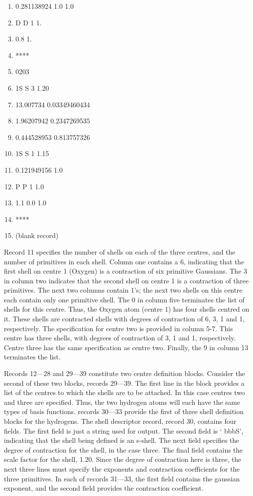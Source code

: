 {{\begin{enumerate}
\item 0.281138924          1.0                 1.0
\item          D   D 1 1.
\item 0.8                                                         1.
\item ****
\item 0203
\item         1S   S 3 1.20
\item 13.007734            0.03349460434
\item  1.96207942           0.2347269535
\item 0.444528953          0.813757326
\item         1S   S 1 1.15
\item 0.121949156          1.0
\item          P   P 1 1.0
\item 1.1                  0.0                 1.0
\item ****
\item (blank record)
\end{enumerate}
}
}
\newpage
Record 11 specifies the number of shells on each of the three centres, and
the number of primitives in each shell.  Column one contains a 6, indicating
that the first shell on centre 1 (Oxygen) is a contraction of six primitive
Gaussians.  The 3 in column two indicates that the second shell on centre 1
is a contraction of three primitives.  The next two columns contain 1's; the
next two shells on this centre each contain only one primitive shell.  
The 0
in column five terminates the list of shells for this centre.  Thus, the
Oxygen atom (centre 1) has four shells centred on it.  These shells are
contracted shells with degrees of contraction of 6, 3, 1 and 1, respectively.
The specification for centre two is provided in column 5-7.  This centre has
three shells, with degrees of contraction of 3, 1 and 1, respectively.
Centre three has the same specification as centre two. Finally, the
9 in column 13 terminates the list.

Records 12---28 and 29---39 constitute two centre definition blocks.
Consider the second of these two blocks, records 29---39.  
The first line in the
block provides a list of the centres to which the shells are to be
attached.  In this case centres two and three are specified.  Thus, the two
hydrogen atoms will each have the same types of basis functions. records
30---33 provide the first of three shell definition blocks for the
hydrogens.  The shell descriptor record, record 30, contains four fields.
The first field is just a string used for output.  The second field is
` bbbS', indicating that the shell being defined is an s-shell.  The
next field specifies the degree of contraction for the shell, in the
case three.  The final field contains the scale factor for the shell,
1.20.  Since the degree of contraction here is three, the next three
lines must specify the exponents and contraction coefficients for
the three primitives.  In each of records 31---33, the first field
contains the gaussian exponent, and the second field provides the
contraction coefficient.

